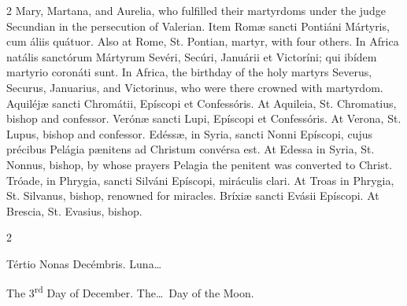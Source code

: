 \begin{paracol}{2}
 Mary, Martana, and Aurelia, who fulfilled their martyrdoms under the judge 
 Secundian in the persecution of Valerian.
\switchcolumn*
{}
Item Romæ sancti 
 Pontiáni Mártyris, cum áliis quátuor.
\switchcolumn
{}
Also at Rome, St. Pontian, martyr, 
 with four others.
\switchcolumn*
{}
In Africa natális 
 sanctórum Mártyrum Sevéri, Secúri, Januárii et Victoríni; qui ibídem 
 martyrio coronáti sunt.
\switchcolumn
{}
In Africa, the birthday of the holy 
 martyrs Severus, Securus, Januarius, and Victorinus, who were there crowned 
 with martyrdom.
\switchcolumn*
{}
Aquiléjæ sancti 
 Chromátii, Epíscopi et Confessóris.
\switchcolumn
{}
At Aquileia, St. Chromatius, bishop 
 and confessor.
\switchcolumn*
{}
Verónæ sancti Lupi, 
 Epíscopi et Confessóris.
\switchcolumn
{}
At Verona, St. Lupus, bishop and 
 confessor.
\switchcolumn*
{}
Edéssæ, in Syria, 
 sancti Nonni Epíscopi, cujus précibus Pelágia pænitens ad Christum convérsa 
 est.
\switchcolumn
{}
At Edessa in Syria, St. Nonnus, 
 bishop, by whose prayers Pelagia the penitent was converted to Christ.
\switchcolumn*
{}
Tróade, in Phrygia, 
 sancti Silváni Epíscopi, miráculis clari.
\switchcolumn
{}
At Troas in Phrygia, St. Silvanus, 
 bishop, renowned for miracles.
\switchcolumn*
{}
Bríxiæ sancti Evásii 
 Epíscopi.
\switchcolumn
{}
At Brescia, St. Evasius, bishop.
\switchcolumn*
{}
\end{paracol}


\begin{paracol}{2}
\begin{center}{\color{gregoriocolor} Tértio Nonas Decémbris. 
 Luna\dots\ }\end{center}
\switchcolumn
{}
\begin{center}{\color{gregoriocolor} The 
 3\textsuperscript{rd} Day of 
 December. The\dots\ Day of the Moon.}\end{center}
\end{paracol}

